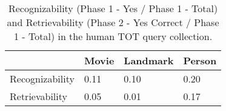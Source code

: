 \begin{table}[h]
\begin{tabular}{l|lll}
                & Movie & Landmark & Person \\ \hline
Recognizability & 0.11  & 0.10     & 0.20      \\
Retrievability  & 0.05  & 0.01     & 0.17      \\ 
\end{tabular}
\caption{Recognizability (Phase 1 - Yes / Phase 1 - Total) and Retrievability (Phase 2 - Yes Correct / Phase 1 - Total) in the human TOT query collection.}
\label{tab:psychology-connection}
\end{table}